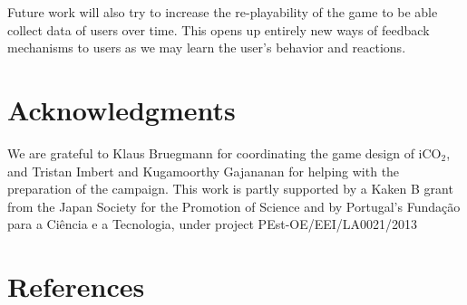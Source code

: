 \documentclass[preprint,authoryear,12pt]{elsarticle}
\begin{document}
Future work will also try to increase the re-playability of the game to be able collect data of users over time. This opens up entirely new ways of feedback mechanisms to users as we may learn the user's behavior and reactions.


\section{Acknowledgments}
We are grateful to Klaus Bruegmann for coordinating the game design of iCO$_2$, and Tristan Imbert and Kugamoorthy Gajananan for helping with the preparation of the campaign.
This work is partly supported by a Kaken B grant from the Japan Society for the Promotion of Science and by Portugal’s Fundação para a Ciência e a Tecnologia, under project
PEst-OE/EEI/LA0021/2013



\section*{References}









\end{document}
